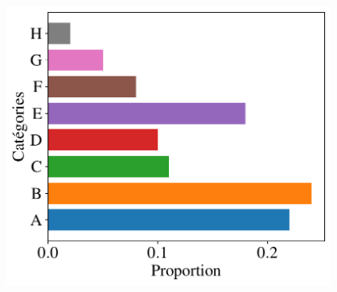 \documentclass[sans,14pt]{beamer}
\begin{document}
{\begin{frame}
\begin{minipage}[h]{0.49\linewidth}
\begin{center}
    \end{center}
  \end{minipage}
  \pause
  \begin{minipage}[h]{0.49\linewidth}
    \begin{center}
      \includegraphics[width=0.8\textwidth]{../poly/figures/pratiques/areas_bars}
    \end{center}
  \end{minipage}  
\end{frame}


}
\end{document}
